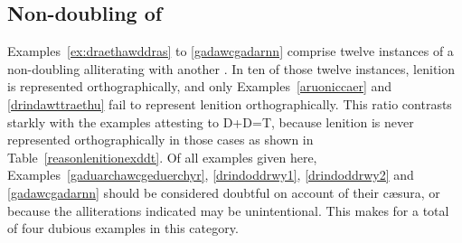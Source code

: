 \subsection{Non-doubling of  \lT}
Examples~\ref{ex:draethawddras} to \ref{gadawcgadarnn} comprise twelve instances of a non-doubling {\lT} alliterating with another {\lT}. In ten of those twelve instances, lenition is represented orthographically, and only Examples~\ref{aruoniccaer} and \ref{drindawttraethu} fail to represent lenition orthographically. This ratio contrasts starkly with the examples attesting to \gls{D}+\gls{D}=\gls{T}, because lenition is never represented orthographically in those cases as shown in Table~\ref{reasonlenitionexddt}.
Of all examples given here, Examples~\ref{gaduarchawcgeduerchyr}, \ref{drindoddrwy1}, \ref{drindoddrwy2} and
\ref{gadawcgadarnn} should be considered doubtful on account of their cæsura, or because the alliterations indicated may be unintentional. This makes for a total of four dubious examples in this category.

